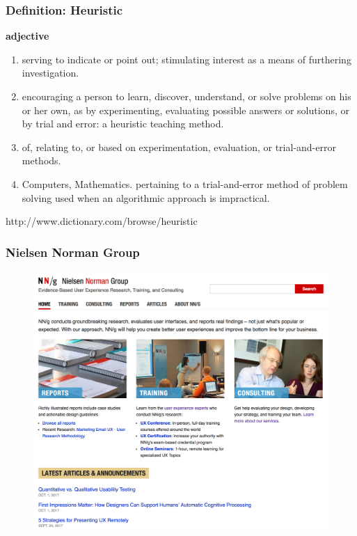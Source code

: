 \begin{frame}
	\frametitle{Definition: Heuristic}
		
	\textbf{adjective}
	\begin{enumerate}
		\item serving to indicate or point out; stimulating interest as a means of furthering investigation.
		\item encouraging a person to learn, discover, understand, or solve problems on his or her own, as by experimenting, evaluating possible answers or solutions, or by trial and error:
a heuristic teaching method.
		\item of, relating to, or based on experimentation, evaluation, or trial-and-error methods.
		\item Computers, Mathematics. pertaining to a trial-and-error method of problem solving used when an algorithmic approach is impractical.
	\end{enumerate}
	
	\tiny{http://www.dictionary.com/browse/heuristic}
\end{frame}


\begin{frame}
	\frametitle{Nielsen Norman Group}
	\begin{figure}
		\href{https://www.nngroup.com/}{\includegraphics[scale=.2]{assets/nngroup}}
	\end{figure}
\end{frame}

